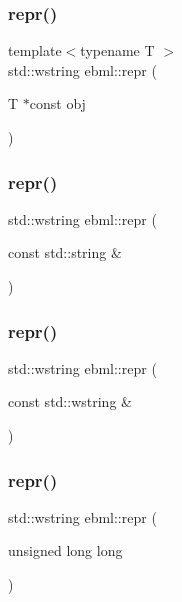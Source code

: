 \subsubsection{\texorpdfstring{repr()}{repr()}\hspace{0.1cm}{\footnotesize\ttfamily [3/10]}}
{\footnotesize\ttfamily template$<$typename T $>$ \\
std\+::wstring ebml\+::repr (\begin{DoxyParamCaption}\item[{T $\ast$const}]{obj }\end{DoxyParamCaption})}

\mbox{\label{namespaceebml_a6021a6dce62f371d7ed989dc29be2599}} 
\subsubsection{\texorpdfstring{repr()}{repr()}\hspace{0.1cm}{\footnotesize\ttfamily [4/10]}}
{\footnotesize\ttfamily std\+::wstring ebml\+::repr (\begin{DoxyParamCaption}\item[{const std\+::string \&}]{ }\end{DoxyParamCaption})}

\mbox{\label{namespaceebml_a69e4c6909c8a7fc69edd32e99ec8a490}} 
\subsubsection{\texorpdfstring{repr()}{repr()}\hspace{0.1cm}{\footnotesize\ttfamily [5/10]}}
{\footnotesize\ttfamily std\+::wstring ebml\+::repr (\begin{DoxyParamCaption}\item[{const std\+::wstring \&}]{ }\end{DoxyParamCaption})}

\mbox{\label{namespaceebml_a82cacdcda15dab54cb129baca549eb2f}} 
\subsubsection{\texorpdfstring{repr()}{repr()}\hspace{0.1cm}{\footnotesize\ttfamily [6/10]}}
{\footnotesize\ttfamily std\+::wstring ebml\+::repr (\begin{DoxyParamCaption}\item[{unsigned long}]{long }\end{DoxyParamCaption})}

